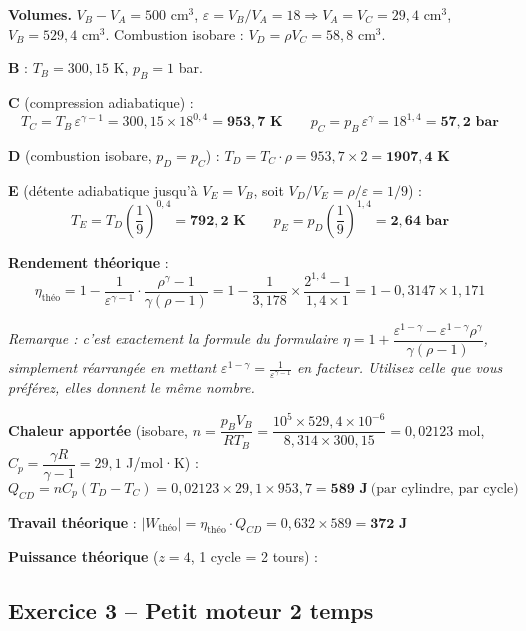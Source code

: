 \begin{correction}
\textbf{Volumes.} $V_B-V_A=500\text{ cm}^3$, $\varepsilon=V_B/V_A=18\Rightarrow V_A=V_C=29{,}4\text{ cm}^3$,
$V_B=529{,}4\text{ cm}^3$. Combustion isobare : $V_D=\rho V_C=58{,}8\text{ cm}^3$.

\textbf{B} : $T_B=300{,}15$ K, $p_B=1$ bar.

\textbf{C} (compression adiabatique) :
\[T_C=T_B\,\varepsilon^{\gamma-1}=300{,}15\times18^{0{,}4}=\mathbf{953{,}7\text{ K}}\qquad
p_C=p_B\,\varepsilon^\gamma=18^{1{,}4}=\mathbf{57{,}2\text{ bar}}\]

\textbf{D} (combustion isobare, $p_D=p_C$) : $T_D=T_C\cdot\rho=953{,}7\times2=\mathbf{1907{,}4\text{ K}}$

\textbf{E} (détente adiabatique jusqu'à $V_E=V_B$, soit $V_D/V_E=\rho/\varepsilon=1/9$) :
\[T_E=T_D\left(\frac{1}{9}\right)^{0{,}4}=\mathbf{792{,}2\text{ K}}\qquad
p_E=p_D\left(\frac{1}{9}\right)^{1{,}4}=\mathbf{2{,}64\text{ bar}}\]

\textbf{Rendement théorique} :
\[\eta_{\text{théo}}=1-\frac{1}{\varepsilon^{\gamma-1}}\cdot\frac{\rho^\gamma-1}{\gamma(\rho-1)}
=1-\frac{1}{3{,}178}\times\frac{2^{1{,}4}-1}{1{,}4\times1}=1-0{,}3147\times1{,}171\]

\emph{Remarque : c'est exactement la formule du formulaire
$\eta=1+\dfrac{\varepsilon^{1-\gamma}-\varepsilon^{1-\gamma}\rho^{\gamma}}{\gamma(\rho-1)}$, simplement
réarrangée en mettant $\varepsilon^{1-\gamma}=\frac{1}{\varepsilon^{\gamma-1}}$ en facteur. Utilisez celle
que vous préférez, elles donnent le même nombre.}

\textbf{Chaleur apportée} (isobare, $n=\dfrac{p_BV_B}{RT_B}=\dfrac{10^5\times529{,}4\times10^{-6}}
{8{,}314\times300{,}15}=0{,}02123$ mol, $C_p=\dfrac{\gamma R}{\gamma-1}=29{,}1$ J/mol·K) :
\[Q_{CD}=nC_p(T_D-T_C)=0{,}02123\times29{,}1\times953{,}7=\mathbf{589\text{ J}}\ \text{(par cylindre, par cycle)}\]

\textbf{Travail théorique} : $|W_{\text{théo}}|=\eta_{\text{théo}}\cdot Q_{CD}=0{,}632\times589=\mathbf{372\text{ J}}$

\textbf{Puissance théorique} ($z=4$, 1 cycle = 2 tours) :
\end{correction}

\subsection{Exercice 3 -- Petit moteur 2 temps}

